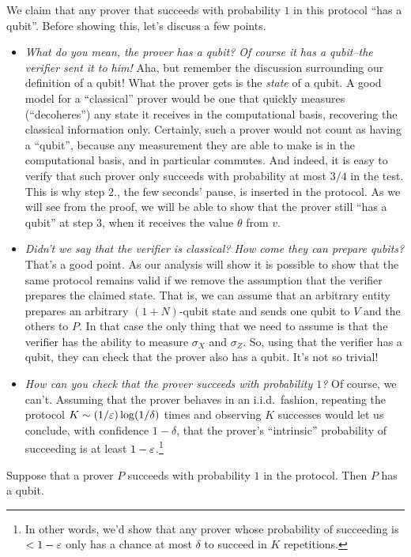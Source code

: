 We claim that any prover that succeeds with probability $1$ in this protocol ``has a qubit''. Before showing this, let's discuss a few points. 
\begin{itemize}
\item \emph{What do you mean, the prover has a qubit? Of course it has a qubit--the verifier sent it to him!} Aha, but remember the discussion surrounding our definition of a qubit! What the prover gets is the \emph{state} of a qubit. A good model for a ``classical'' prover would be one that quickly measures (``decoheres'') any state it receives in the computational basis, recovering the classical information only. Certainly, such a prover would not count as having a ``qubit'', because any measurement they are able to make is in the computational basis, and in particular commutes. And indeed, it is easy to verify that such prover only succeeds with probability at most $3/4$ in the test. This is why step 2., the few seconds' pause, is inserted in the protocol. As we will see from the proof, we will be able to show that the prover still ``has a qubit'' at step 3, when it receives the value $\theta$ from $v$. 
\item \emph{Didn't we say that the verifier is classical? How come they can prepare qubits?} That's a good point. As our analysis will show it is possible to show that the same protocol remains valid if we remove the assumption that the verifier prepares the claimed state. That is, we can assume that an arbitrary entity prepares an arbitrary $(1+N)$-qubit state and sends one qubit to $V$ and the others to $P$. In that case the only thing that we need to assume is that the verifier has the ability to measure $\sigma_X$ and $\sigma_Z$. So, using that the verifier has a qubit, they can check that the prover also has a qubit. It's not so trivial!
\item \emph{How can you check that the prover succeeds with probability $1$?} Of course, we can't. Assuming that the prover behaves in an i.i.d.\ fashion, repeating the protocol $ K \sim (1/\varepsilon)\log (1/\delta)$ times and observing $K$ successes would let us conclude, with confidence $1-\delta$, that the prover's ``intrinsic'' probability of succeeding is at least $1-\varepsilon$.\footnote{In other words, we'd show that any prover whose probability of succeeding is $<1-\varepsilon$ only has a chance at most $\delta$ to succeed in $K$ repetitions.}
\end{itemize}

\begin{lemma}\label{lem:qubit-test-1}
Suppose that a prover $P$ succeeds with probability $1$ in the protocol. Then $P$ has a qubit. 
\end{lemma}

